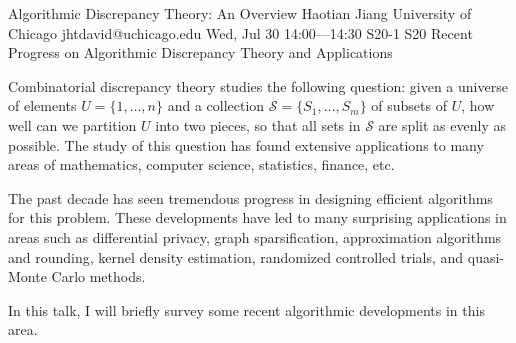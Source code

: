 \begin{talk}
  {Algorithmic Discrepancy Theory: An Overview}%
  {Haotian Jiang}%
  {University of Chicago}%
  {jhtdavid@uchicago.edu}%
  {}%
  {}%
  {Wed, Jul 30 14:00---14:30}%
  {S20-1}%
  {S20}%
  {}
  {Recent Progress on Algorithmic Discrepancy Theory and Applications}
    
   
Combinatorial discrepancy theory studies the following question: given a universe of elements $U=\{1,\ldots, n\}$ and a collection $\mathcal{S} = \{S_1, \ldots, S_m\}$ of subsets of $U$, how well can we partition $U$ into two pieces, so that all sets in $\mathcal{S}$ are split as evenly as possible.
The study of this question has found extensive applications to many areas of mathematics, computer science, statistics, finance, etc. 

The past decade has seen tremendous progress in designing efficient algorithms for this problem. These developments have led to many surprising applications in areas such as differential privacy, graph sparsification, approximation algorithms and rounding, kernel density estimation, randomized controlled trials, and quasi-Monte Carlo methods.

In this talk, I will briefly survey some recent algorithmic developments in this area. 



\end{talk}

